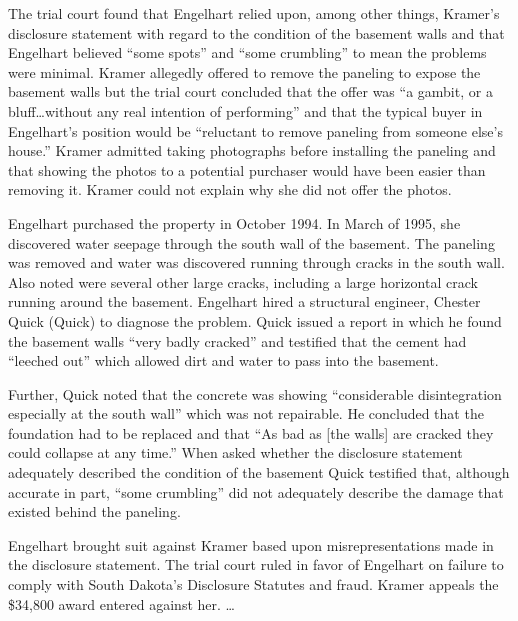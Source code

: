 The trial court found that Engelhart relied upon, among other things, Kramer's
disclosure statement with regard to the condition of the basement walls and
that Engelhart believed ``some spots'' and ``some crumbling'' to mean the
problems were minimal. Kramer allegedly offered to remove the paneling to
expose the basement walls but the trial court concluded that the offer was ``a
gambit, or a bluff\ldots without any real intention of performing'' and that the
typical buyer in Engelhart's position would be ``reluctant to remove paneling
from someone else's house.'' Kramer admitted taking photographs before
installing the paneling and that showing the photos to a potential purchaser
would have been easier than removing it. Kramer could not explain why she did
not offer the photos.

Engelhart purchased the property in October 1994. In March of 1995, she
discovered water seepage through the south wall of the basement. The paneling
was removed and water was discovered running through cracks in the south wall.
Also noted were several other large cracks, including a large horizontal crack
running around the basement. Engelhart hired a structural engineer, Chester
Quick (Quick) to diagnose the problem. Quick issued a report in which he found
the basement walls ``very badly cracked'' and testified that the cement had
``leeched out'' which allowed dirt and water to pass into the
basement.

Further, Quick noted that the concrete was showing ``considerable disintegration
especially at the south wall'' which was not repairable. He concluded that the
foundation had to be replaced and that ``As bad as [the walls] are cracked they
could collapse at any time.'' When asked whether the disclosure statement
adequately described the condition of the basement Quick testified that,
although accurate in part, ``some crumbling'' did not adequately describe the
damage that existed behind the paneling.

Engelhart brought suit against Kramer based upon misrepresentations made in the
disclosure statement. The trial court ruled in favor of Engelhart on failure to
comply with South Dakota's Disclosure Statutes and fraud. Kramer appeals the
\$34,800 award entered against her. \dots{}

